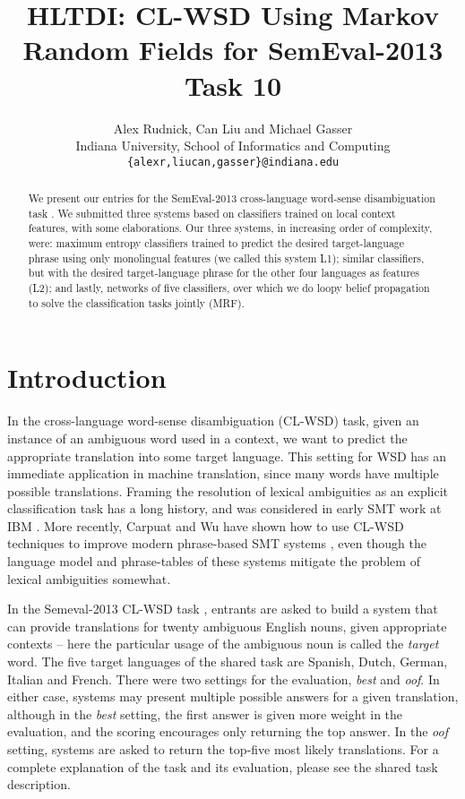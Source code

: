\documentclass[11pt,letterpaper]{article}
\title{HLTDI: CL-WSD Using Markov Random Fields for SemEval-2013 Task 10}
\author{Alex Rudnick, Can Liu and Michael Gasser\\
	    Indiana University, School of Informatics and Computing \\
	    {\tt \{alexr,liucan,gasser\}@indiana.edu}}
\date{}
\begin{document}
\maketitle

\begin{abstract}
We present our entries for the SemEval-2013 cross-language word-sense
disambiguation task \cite{task10}. We submitted three systems based on
classifiers trained on local context features, with some elaborations. Our
three systems, in increasing order of complexity, were: maximum entropy
classifiers trained to predict the desired target-language phrase using only
monolingual features (we called this system L1); similar classifiers,
but with the desired target-language phrase for the other four languages as
features (L2); and lastly, networks of five classifiers, over which we
do loopy belief propagation to solve the classification tasks jointly
(MRF).
\end{abstract}



\section{Introduction}
In the cross-language word-sense disambiguation (CL-WSD) task, given an
instance of an ambiguous word used in a context, we want to predict the
appropriate translation into some target language. This setting for WSD has an
immediate application in machine translation, since many words have multiple
possible translations. Framing the resolution of lexical ambiguities as an
explicit classification task has a long history, and was considered in early
SMT work at IBM \cite{Brown91word-sensedisambiguation}. More recently, Carpuat
and Wu have shown how to use CL-WSD techniques to improve modern phrase-based
SMT systems \cite{carpuatpsd}, even though the language model and phrase-tables
of these systems mitigate the problem of lexical ambiguities somewhat.

In the Semeval-2013 CL-WSD task \cite{task10}, entrants are asked to build a
system that can provide translations for twenty ambiguous English nouns, given
appropriate contexts -- here the particular usage of the ambiguous noun is
called the \emph{target} word. The five target languages of the shared task are
Spanish, Dutch, German, Italian and French. There were two settings for the
evaluation, \emph{best} and \emph{oof}. In either case, systems may present
multiple possible answers for a given translation, although in the \emph{best}
setting, the first answer is given more weight in the evaluation, and the
scoring encourages only returning the top answer. In the \emph{oof} setting,
systems are asked to return the top-five most likely translations. For a
complete explanation of the task and its evaluation, please see the shared task
description. 
\end{document}
